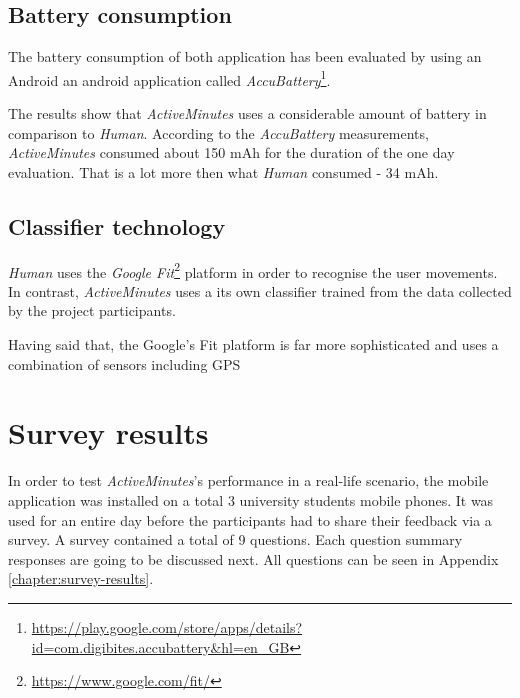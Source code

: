 \subsection{Battery consumption}
The battery consumption of both application has been evaluated by using an Android an android application called \textit{AccuBattery}\footnote{\url{https://play.google.com/store/apps/details?id=com.digibites.accubattery&hl=en_GB}}. 

The results show that \textit{ActiveMinutes} uses a considerable amount of battery in comparison to \textit{Human}. According to the \textit{AccuBattery} measurements, \textit{ActiveMinutes} consumed about 150 mAh for the duration of the one day evaluation. That is a lot more then what \textit{Human} consumed - 34 mAh.

\subsection{Classifier technology}
\textit{Human} uses the \textit{Google Fit}\footnote{\url{https://www.google.com/fit/}} platform in order to recognise the user movements. In contrast, \textit{ActiveMinutes} uses a its own classifier trained from the data collected by the project participants.

Having said that, the Google's Fit platform is far more sophisticated and uses a combination of sensors including GPS

\section{Survey results}
In order to test \textit{ActiveMinutes}'s performance in a real-life scenario, the mobile application was installed on a total 3 university students mobile phones. It was used for an entire day before the participants had to share their feedback via a survey. A survey contained a total of 9 questions. Each question summary responses are going to be discussed next. All questions can be seen in Appendix \ref{chapter:survey-results}.

